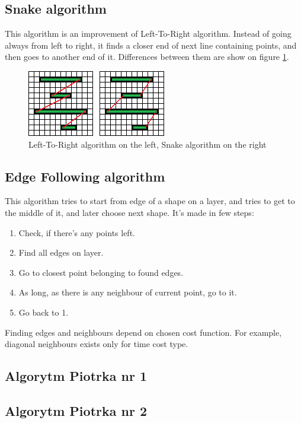 \documentclass[titlepage]{article}
\begin{document}
\subsection{Snake algorithm}
This algorithm is an improvement of Left-To-Right algorithm. Instead of going always from left to right, it finds a closer end of next line containing points, and then goes to another end of it. Differences between them are show on figure \ref{img:ltr-vs-snake}.

\begin{figure}
\begin{center}
\includegraphics[scale=2]{img/ltr-vs-snake}
\caption{Left-To-Right algorithm on the left, Snake algorithm on the right}
\label{img:ltr-vs-snake}
\end{center}
\end{figure}

\subsection{Edge Following algorithm}
This algorithm tries to start from edge of a shape on a layer, and tries to get to the middle of it, and later choose next shape.
It's made in few steps:
\begin{enumerate}
\item Check, if there's any points left.
\item Find all edges on layer.
\item Go to closest point belonging to found edges.
\item As long, as there is any neighbour of current point, go to it.
\item Go back to 1.
\end{enumerate}
Finding edges and neighbours depend on chosen cost function. For example, diagonal neighbours exists only for time cost type.

\subsection{Algorytm Piotrka nr 1}

\subsection{Algorytm Piotrka nr 2}
\end{document}
